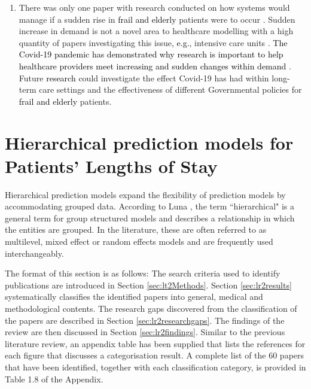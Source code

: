 \documentclass[../thesis.tex]{subfiles}
\begin{document}
\begin{enumerate}
\item There was only one paper with research conducted on how systems would manage if a sudden rise in \textcolor{black}{frail and elderly} patients were to occur \cite{Arvelo}. Sudden increase in demand is not a novel area to healthcare modelling with a high quantity of papers investigating this issue\textcolor{black}{, e.g.,} intensive care units \cite{Corke, Kahn, Williams}. \textcolor{black}{The Covid-19 pandemic has demonstrated why research is important to help healthcare providers meet increasing and sudden changes within demand} \cite{WHO2}. %
Future \textcolor{black}{research} could investigate the effect Covid-19 has had within long-term care settings and the effectiveness of different Governmental policies for \textcolor{black}{frail and elderly} patients. 

\end{enumerate}

\section{Hierarchical prediction models for Patients’ Lengths of Stay}\label{sec:litreview2}

Hierarchical prediction models expand the flexibility of prediction models by accommodating grouped data. According to Luna \cite{Luna1993}, the term ``hierarchical" is a general term for group structured models and describes a relationship in which the entities are grouped. In the literature, these are often referred to as multilevel, mixed effect or random effects models and are frequently used interchangeably.

The format of this section is as follows: The search criteria used to identify publications are introduced in Section \ref{sec:lt2Methods}. Section \ref{sec:lr2results} systematically classifies the identified papers into general, medical and methodological contents. The research gaps discovered from the classification of the papers are described in Section \ref{sec:lr2researchgaps}. The findings of the review are then discussed in Section \ref{sec:lr2findings}. Similar to the previous literature review, an appendix table has been supplied that lists the references for each figure that discusses a categorisation result. A complete list of the 60 papers that have been identified, together with each classification category, is provided in Table 1.8 of the Appendix.
\end{document}
